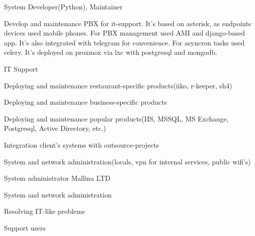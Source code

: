 \begin{cventries}
  \cventry
    {System Developer(Python), Maintainer} %
    {} %
    {} %
    {} %
    {
      \begin{cvitems} %
        Develop and maintenance PBX for it-support. It's based on asterisk, as endpoints devices used mobile phones.
        For PBX management used AMI and django-based app. It's also integrated with telegram for convenience.
        For asyncron tasks used celery.
        It's deployed on proxmox via lxc with postgresql and mongodb.
      \end{cvitems}
    }

  \cventry
    {IT Support} %
    {} %
    {} %
    {} %
    {
      \begin{cvitems} %
        \item {Deploying and maintenance restaurant-specific products(iiko, r-keeper, sh4)}
        \item {Deploying and maintenance business-specific products}
        \item {Deploying and maintenance popular products(IIS, MSSQL, MS Exchange, Postgresql,
        Active Directory, etc.)}
      \item {Integration client's systems with outsource-projects}
      \item {System and network administration(locals, vpn for internal services, public wifi's)}
      \end{cvitems}
    }

  \cventry
    {System administrator} %
    {Mallina LTD} %
    {} %
    {} %
    {
      \begin{cvitems} %
        \item {System and network administration}
        \item {Resolving IT-like problems}
        \item {Support users}
      \end{cvitems}
    }

\end{cventries}
